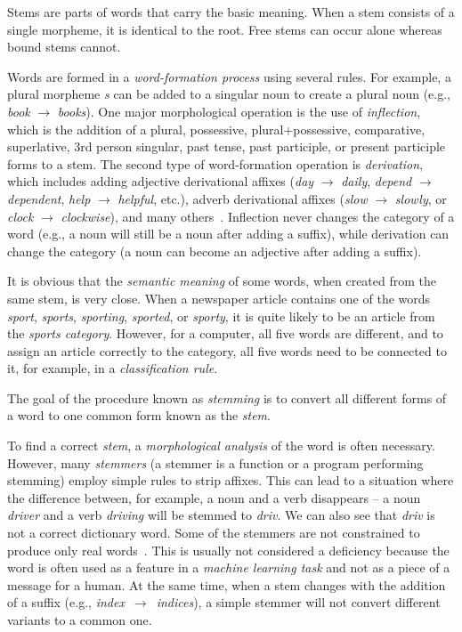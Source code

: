 Stems are parts of words that carry the basic meaning. When a stem consists
of a single morpheme, it is identical to the root. Free stems can occur alone
whereas bound stems cannot.

Words are formed in a \textit{word-formation process} using several rules. 
For example, a plural morpheme \textit{s} can be added to a singular noun to create a plural noun 
(e.g., \textit{book} $\rightarrow$ \textit{books}). One major morphological operation is the use of 
\textit{inflection}, which is the addition of a plural, possessive, plural+possessive, comparative, 
superlative, 3rd person singular, past tense, past participle, or present participle forms to a stem. 
The second type of word-formation operation is \textit{derivation}, which includes adding 
adjective derivational affixes (\textit{day} $\rightarrow$ \textit{daily}, \textit{depend} $\rightarrow$ 
\textit{dependent}, \textit{help} $\rightarrow$ \textit{helpful}, etc.), adverb derivational affixes 
(\textit{slow} $\rightarrow$ \textit{slowly}, or \textit{clock} $\rightarrow$ \textit{clockwise}), 
and many others~\cite{ref126}. Inflection never changes the category of a word 
(e.g., a noun will still be a noun after adding a suffix), while derivation 
can change the category (a noun can become an adjective after adding a suffix).

It is obvious that the \textit{semantic meaning} of some words, when created from
the same stem, is very close. When a newspaper article contains one of the words
\textit{sport}, \textit{sports}, \textit{sporting}, \textit{sported}, or \textit{sporty}, it is quite likely 
to be an article from the \textit{sports category}. However, for a computer, all five words are 
different, and to assign an article correctly to the category, all five words need to be 
connected to it, for example, in a \textit{classification rule}.

The goal of the procedure known as \textit{stemming} is to convert all different forms
of a word to one common form known as the \textit{stem}.

To find a correct \textit{stem}, a \textit{morphological analysis} of the word is often necessary. 
However, many \textit{stemmers} (a stemmer is a function or a program performing 
stemming) employ simple rules to strip affixes. This can lead to a situation where 
the difference between, for example, a noun and a verb disappears -- a noun 
\textit{driver} and a verb \textit{driving} will be stemmed to \textit{driv}. We can also see that 
\textit{driv} is not a correct dictionary word. Some of the stemmers are not constrained 
to produce only real words~\cite{ref189}. This is usually not considered a deficiency 
because the word is often used as a feature in a \textit{machine learning task} and not 
as a piece of a message for a human. At the same time, when a stem changes with 
the addition of a suffix (e.g., \textit{index}~$\rightarrow$~\textit{indices}), a simple stemmer will not 
convert different variants to a common one.

